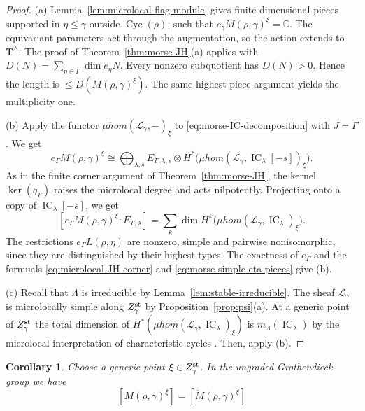 \documentclass[11pt,reqno]{amsart}
\newtheorem{Corollary}[Theorem]{Corollary}
\theoremstyle{definition}
\theoremstyle{remark}
\def\bbC{\mathbb C}
\def\IC{\operatorname{IC}}
\def\Cyc{\operatorname{Cyc}}
\def\muhom{\mu hom}
\def\bT{\mathbf T}
\begin{document}
\begin{proof}\hfill

(a) Lemma~\ref{lem:microlocal-flag-module} gives finite dimensional
pieces supported in $\eta\leqslant\gamma$ outside $\Cyc(\rho)$, such that $e_\gamma M(\rho,\gamma)^\xi=\bbC$.
The equivariant parameters act through the augmentation,
so the action extends to $\bT^\wedge$. The proof of
Theorem~\ref{thm:morse-JH}(a) applies with
$D(N)=\sum_{\eta\in\Gamma}\dim e_\eta N$.
Every nonzero subquotient has $D(N)>0$.
Hence the length is $\leqslant D(M(\rho,\gamma)^\xi)$.
The same highest piece argument yields the multiplicity one.

(b) Apply the functor $\muhom(\mathscr L_\gamma,-)_\xi$ to
\eqref{eq:morse-IC-decomposition} with $J=\Gamma$. We get
\[
 e_\Gamma M(\rho,\gamma)^\xi\cong\bigoplus_{\lambda,s}E_{\Gamma,\lambda,s}
 \otimes H^*\bigl(\muhom(\mathscr L_\gamma,\IC_\lambda[-s])_\xi\bigr).
\]
As in the finite corner argument of Theorem~\ref{thm:morse-JH},
the kernel $\ker (q_\Gamma)$ raises the microlocal degree and acts
nilpotently. Projecting onto a copy of $\IC_\lambda[-s]$, we get
\begin{equation}\label{eq:microlocal-JH-corner}
 [e_\Gamma M(\rho,\gamma)^\xi:E_{\Gamma,\lambda}]
 =\sum_k\dim H^k\bigl(\muhom(\mathscr L_\gamma,\IC_\lambda)_\xi\bigr).
\end{equation}
The restrictions $e_\Gamma L(\rho,\eta)$ are nonzero, simple and
pairwise nonisomorphic, since they are distinguished by their highest types.
The exactness of $e_\Gamma$ and the formuals \eqref{eq:microlocal-JH-corner} and
\eqref{eq:morse-simple-eta-pieces} give (b).

(c) 
Recall that $\Lambda$ is irreducible by Lemma~\ref{lem:stable-irreducible}.
The sheaf $\mathscr L_\gamma$ is microlocally simple along
$Z_\gamma^{\rm st}$ by Proposition~\ref{prop:psi}(a).
At a generic point of $Z_\gamma^{\rm st}$ the total dimension of
$H^*(\muhom(\mathscr L_\gamma,\IC_\lambda)_\xi)$ is
$m_\Lambda(\IC_\lambda)$ by the microlocal interpretation
of characteristic cycles \cite[Ch.~IX]{KS90}. Then, apply (b).
\end{proof}


\begin{Corollary}\label{cor:microlocal-morse-K0}
Choose a generic point $\xi\in Z_\gamma^{\rm st}$.
In the {ungraded} Grothendieck group we have
\begin{equation}\label{eq:microlocal-morse-K0-global}
 [M(\rho,\gamma)^\xi]
  =[\mathring M(\rho,\gamma)^\xi]
\end{equation}
\end{Corollary}
\end{document}
